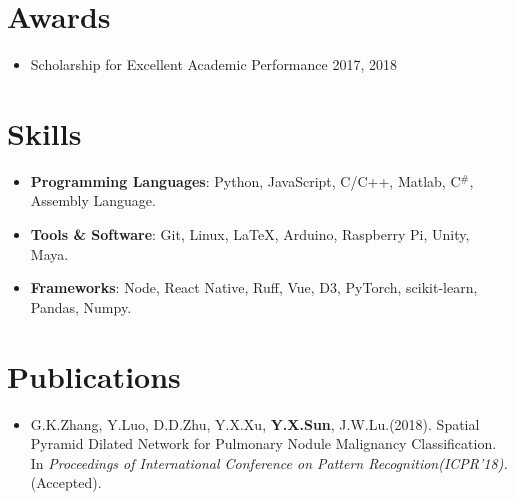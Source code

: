 \documentclass[letterpaper,11pt]{article}
\newcommand{\resumeItem}[2]{
  \item\small{
    \textbf{#1}{: #2 \vspace{-2pt}}
  }
}
\newcommand{\resumeSubItem}[2]{\resumeItem{#1}{#2}\vspace{-4pt}}
\newcommand{\resumeSubHeadingListStart}{\begin{itemize}[leftmargin=*]}
\newcommand{\resumeSubHeadingListEnd}{\end{itemize}}
\begin{document}
\section{Awards}
  \resumeSubHeadingListStart
    \item Scholarship for Excellent Academic Performance \hfill {2017, 2018}
  \resumeSubHeadingListEnd

%
\section{Skills}
 \resumeSubHeadingListStart
   \resumeSubItem{Programming Languages}
   {Python, JavaScript, C/C++, Matlab, C$^{\#}$, Assembly Language.}
   \resumeSubItem{Tools \& Software}
   {Git, Linux, \LaTeX , Arduino, Raspberry Pi, Unity, Maya.}
   \resumeSubItem{Frameworks}
   {Node, React Native, Ruff, Vue, D3, PyTorch, scikit-learn, Pandas, Numpy.}

 \resumeSubHeadingListEnd

\section{Publications}
\resumeSubHeadingListStart
\item G.K.Zhang, Y.Luo, D.D.Zhu, Y.X.Xu, \textbf{Y.X.Sun}, J.W.Lu.(2018). Spatial Pyramid Dilated Network for Pulmonary Nodule Malignancy Classification. In \emph{Proceedings of International Conference on Pattern Recognition(ICPR'18).}(Accepted).
\resumeSubHeadingListEnd
\end{document}
